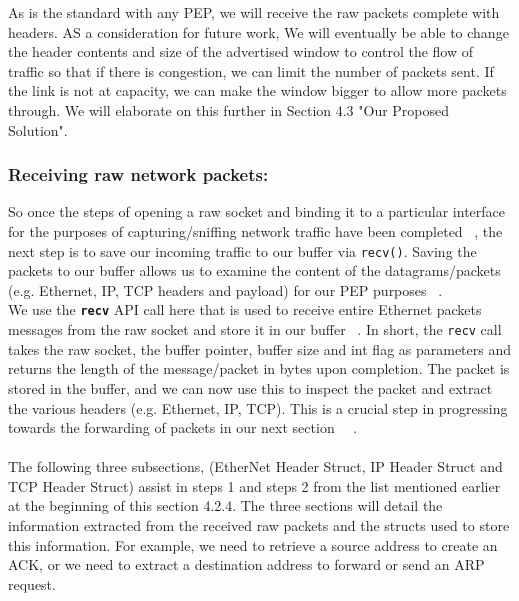 As is the standard with any PEP, we will receive the raw packets complete with headers. AS a consideration for future work, We will eventually be able to change the header contents and size of the advertised window to control the flow of traffic so that if there is congestion, we can limit the number of packets sent. If the link is not at capacity, we can make the window bigger to allow more packets through. We will elaborate on this further in Section 4.3 "Our Proposed Solution". \\

\subsubsection{Receiving raw network packets:}
So once the steps of opening a raw socket and binding it to a particular interface for the purposes of capturing/sniffing network traffic have been completed ~\cite{38}, the next step is to save our incoming traffic to our buffer via {\tt recv()}. Saving the packets to our buffer allows us to examine the content of the datagrams/packets (e.g. Ethernet, IP, TCP headers and payload) for our PEP purposes ~\cite{35}. \\

We use the \textbf{\tt recv} API call here that is used to receive entire Ethernet packets messages from the raw socket and store it in our buffer ~\cite{35}. In short, the {\tt recv} call takes the raw socket, the buffer pointer, buffer size and int flag as parameters and returns the length of the message/packet in bytes upon completion. The packet is stored in the buffer, and we can now use this to inspect the packet and extract the various headers (e.g. Ethernet, IP, TCP). This is a crucial step in progressing towards the forwarding of packets in our next section ~\cite{35}~\cite{38}.\\

\\

The following three subsections, (EtherNet Header Struct, IP Header Struct and TCP Header Struct) assist in steps 1 and steps 2 from the list mentioned earlier at the beginning of this section 4.2.4. The three sections will detail the information extracted from the received raw packets and the structs used to store this information. For example, we need to retrieve a source address to create an ACK, or we need to extract a destination address to forward or send an ARP request. 

